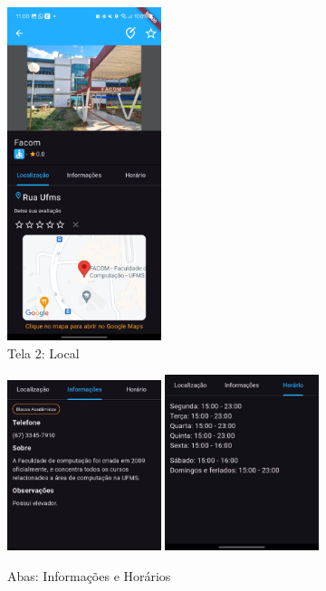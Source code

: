     \begin{figure}[h]
        \centering
        \includegraphics[width=0.4\textwidth]{imagens/local.jpg}
        \caption{\scriptsize Tela 2: Local}
        \label{fig:tela2}
    \end{figure}

    \begin{figure}
        \centering
        \includegraphics[width=0.4\textwidth]{imagens/info.jpg}
        \hspace{10mm}
        \includegraphics[width=0.4\textwidth]{imagens/horario.jpg}
        \caption{\scriptsize Abas: Informações e Horários}
        \label{fig:tela2-abas}
    \end{figure}

